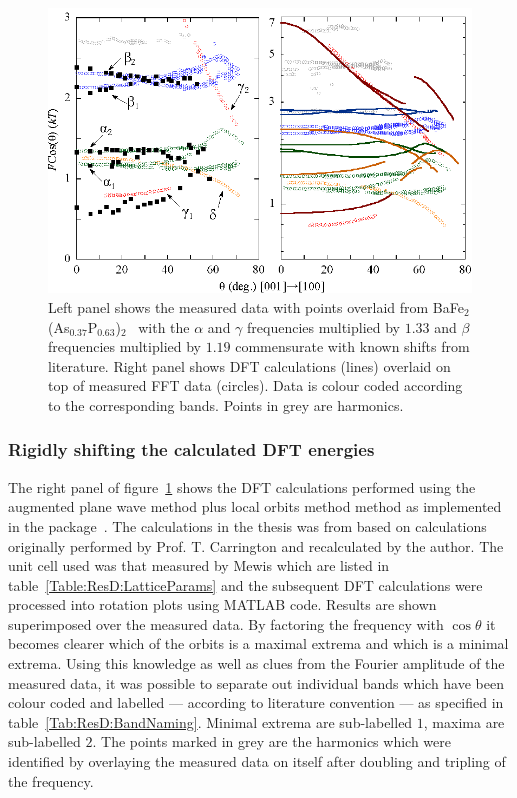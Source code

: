 \begin{figure}[htbp]
    \begin{center}
        \includegraphics[scale=1.0]{Chapter-dHvABaFe2P2/Figures/AngleDepMeasurements/IdentifyingBands/IdentifyingBands}
        \caption{Left panel shows the measured data with points overlaid from BaFe$_2$(As$_{0.37}$P$_{0.63}$)$_2$~\cite{Analytis2010c} with the $\alpha$ and $\gamma$ frequencies multiplied by $1.33$ and $\beta$ frequencies multiplied by $1.19$ commensurate with known shifts from literature. Right panel shows \ac{DFT} calculations (lines) overlaid on top of measured \ac{FFT} data (circles). Data is colour coded according to the corresponding bands. Points in grey are harmonics.}
        \label{Fig:ResD:IdentifyingBands}
    \end{center}
\end{figure}



\subsubsection{Rigidly shifting the calculated \ac{DFT} energies}
    \label{Sec:ResD:DFTShifts}

The right panel of figure~\ref{Fig:ResD:IdentifyingBands} shows the \ac{DFT} calculations performed using the augmented plane wave method plus local orbits method method as implemented in the \WIEN{} package~\cite{Blaha2001}. The calculations in the thesis was from based on calculations originally performed by Prof. T. Carrington and recalculated by the author. The unit cell used was that measured by Mewis \etal{} which are listed in table~\ref{Table:ResD:LatticeParams} and the subsequent \ac{DFT} calculations were processed into rotation plots using MATLAB code. Results are shown superimposed over the measured data. By factoring the frequency with $\cos{\theta}$ it becomes clearer which of the orbits is a maximal extrema and which is a minimal extrema. Using this knowledge as well as clues from the Fourier amplitude of the measured data, it was possible to separate out individual bands which have been colour coded and labelled --- according to literature convention --- as specified in table~\ref{Tab:ResD:BandNaming}. Minimal extrema are sub-labelled $1$, maxima are sub-labelled $2$. The points marked in grey are the harmonics which were identified by overlaying the measured data on itself after doubling and tripling of the frequency.

